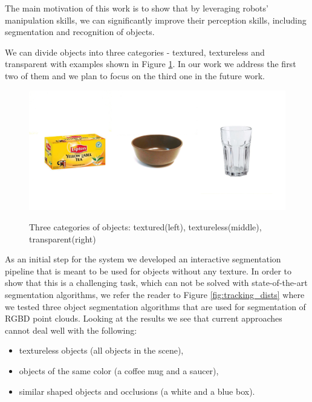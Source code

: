  The main
motivation of this work is to show that by leveraging robots' manipulation skills, we can significantly improve their perception skills, including segmentation and recognition of objects.
	

	
	
We can divide objects into three categories - textured, textureless and transparent with examples shown in Figure \ref{fig:all-objects}. In our work we address the first two of them and we plan to focus on the third one in the future work.

\begin{figure}
\centering

{\includegraphics[width=1\columnwidth]{figures/all-objects.jpg}}

\caption{Three categories of objects: textured(left), textureless(middle), transparent(right)}
\label{fig:all-objects}
\end{figure}

As an initial step for the system we developed an interactive segmentation pipeline that is meant to be used for objects without any texture. In order to show that this is a challenging task, which can not be solved with state-of-the-art segmentation algorithms, we refer the reader to Figure \ref{fig:tracking_dists} where we tested three object segmentation algorithms that are used for segmentation of RGBD point clouds. Looking at the results we see that current approaches cannot deal well with the following: 

\begin{itemize} 
\item textureless objects (all objects in the scene),
\item objects of the same color (a coffee mug and a saucer),
\item similar shaped objects and occlusions (a white and a blue box).
\end{itemize}


